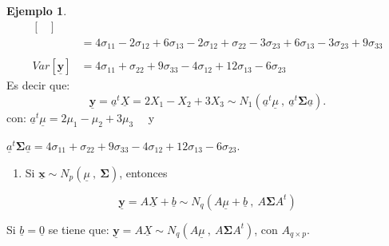 \documentclass[
]{book}
\providecommand{\tightlist}{%
  \setlength{\itemsep}{0pt}\setlength{\parskip}{0pt}}
\theoremstyle{definition}
\theoremstyle{definition}
\newtheorem{example}{Ejemplo}[chapter]
\theoremstyle{definition}
\theoremstyle{definition}
\theoremstyle{remark}
\begin{document}
\begin{example}
\begin{align*}
\begin{bmatrix}
\end{bmatrix}\\
&=4\sigma_{11}-2\sigma_{12}+6\sigma_{13}- 
2\sigma_{12}+\sigma_{22}-3\sigma_{23} +
6\sigma_{13}-3\sigma_{23}+9\sigma_{33}\\
&\\
Var[\underline{\mathbf{y}}]&=4\sigma_{11}
+\sigma_{22}+9\sigma_{33}-4\sigma_{12}+12\sigma_{13}-6\sigma_{23}
\end{align*}
Es decir que:
\[
\underline{\mathbf{y}}=\underline{a}^t\underline{X}=2X_1-X_2+3X_3 \sim N_1(\underline{a}^t\underline{\mu}\ ,\ \underline{a}^t \mathbf{\Sigma} \underline{a}).
\]
con: \(\underline{a}^t \underline{\mu}=2\mu_1-\mu_2+3\mu_3\)~~ y

\(\underline{a}^t \mathbf{\Sigma} \underline{a}= 4\sigma_{11}+\sigma_{22}+9\sigma_{33}-4\sigma_{12}+ 12\sigma_{13}-6\sigma_{23}\).
\end{example}

\begin{enumerate}
\def\labelenumi{\arabic{enumi}.}
\setcounter{enumi}{2}
\tightlist
\item
  Si \(\underline{\mathbf{x}}\sim N_p (\underline{\mu} \ , \ \mathbf{\Sigma})\), entonces
\end{enumerate}

\begin{equation} 
\underline{\mathbf{y}}=A \underline{X}+ \underline{b} \sim N_q(A \underline{\mu}+\underline{b}\ , \ A\mathbf{\Sigma} A^t )
\label{eq:prop-3}
\end{equation}

Si \(\underline{b}=\underline{0}\) se tiene que:
\(\underline{\mathbf{y}}=A \underline{X}\sim N_q(A \underline{\mu}\ , \ A\mathbf{\Sigma} A^t )\), con \(A_{q\times p}\).
\end{document}
